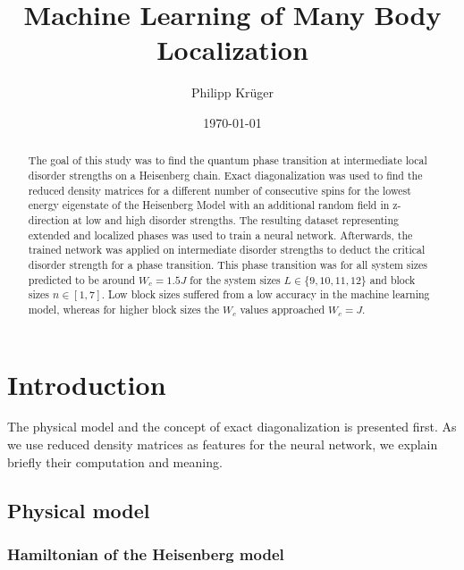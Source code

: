 \documentclass[reprint,amsmath,amssymb,aps,prb]{revtex4-2}
\begin{document}
%

\title{Machine Learning of Many Body Localization}

\author{Philipp Krüger}

\date{\today}%

\begin{abstract}
The goal of this study was to find the quantum phase transition at intermediate local disorder strengths on a Heisenberg chain. Exact diagonalization was used to find the reduced density matrices for a different number of consecutive spins for the lowest energy eigenstate of the Heisenberg Model with an additional random field in z-direction at low and high disorder strengths. The resulting dataset representing extended and localized phases was used to train a neural network. Afterwards, the trained network was applied on intermediate disorder strengths to deduct the critical disorder strength for a phase transition. This phase transition was for all system sizes predicted to be around $W_c = 1.5 J$ for the system sizes $L\in\{9, 10, 11, 12\}$ and block sizes $n\in\left[1,7\right]$. Low block sizes suffered from a low accuracy in the machine learning model, whereas for higher block sizes the $W_c$ values approached $W_c=J$.  %
\end{abstract}

\maketitle

\section{Introduction}

The physical model and the concept of exact diagonalization is presented first. As we use reduced density matrices as features for the neural network, we explain briefly their computation and meaning.
\subsection{Physical model}

\subsubsection{Hamiltonian of the Heisenberg model}
\end{document}
